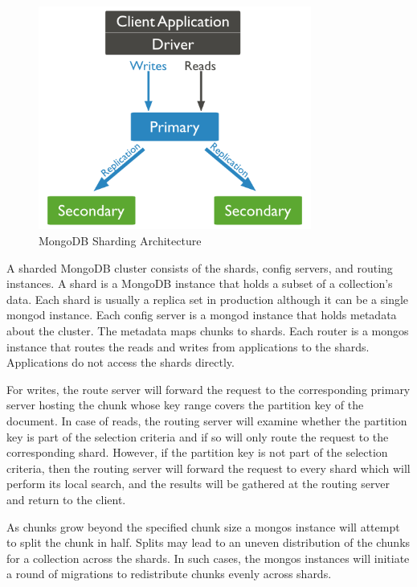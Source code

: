\documentclass[12pt]{book}
\begin{document}
\begin{figure}[t]
\includegraphics[width=0.8\textwidth]{images/mongodb-replica-set.png}
\centering
\caption{MongoDB Sharding Architecture}
\end{figure}

A sharded MongoDB cluster consists of the shards, config servers, and routing instances. A shard is a MongoDB instance that holds a subset of a collection's data. Each shard is usually a replica set in production although it can be a single mongod instance. Each config server is a mongod instance that holds metadata about the cluster. The metadata maps chunks to shards. Each router is a mongos instance that routes the reads and writes from applications to the shards. Applications do not access the shards directly.

For writes, the route server will forward the request to the corresponding primary server hosting the chunk whose key range covers the partition key of the document. In case of reads, the routing server will examine whether the partition key is part of the selection criteria and if so will only route the request to the corresponding shard. However, if the partition key is not part of the selection criteria, then the routing server will forward the request to every shard which will perform its local search, and the results will be gathered at the routing server and return to the client.

As chunks grow beyond the specified chunk size a mongos instance will attempt to split the chunk in half. Splits may lead to an uneven distribution of the chunks for a collection across the shards. In such cases, the mongos instances will initiate a round of migrations to redistribute chunks evenly across shards.
\end{document}
